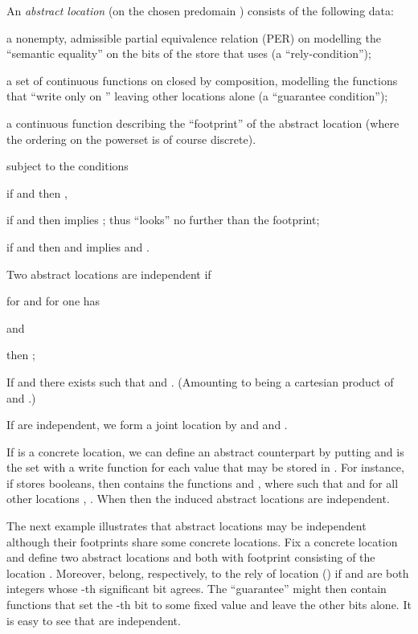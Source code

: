 \documentclass[orivec]{llncs}
\begin{document}
\begin{definition}
\label{def:abstract-location}
  An \emph{abstract location}  (on the chosen predomain
  ) consists of the following data:
\begin{compactitem}
\item a nonempty, admissible partial equivalence relation (PER)  on
   modelling the ``semantic equality'' on the bits of the
  store that  uses (a ``rely-condition'');
\item a set  of continuous functions on  closed by
composition, modelling the functions that ``write only on '' leaving 
other locations alone (a ``guarantee condition'');
\item a continuous function  describing the ``footprint''
   of the abstract location (where the ordering on the powerset
 is of course discrete).
\end{compactitem}
subject to the conditions
\begin{compactitem}
\item if  and  then ,  
\item if 
  and 
  then  implies
  ; thus  ``looks'' no further
  than the footprint;
\item if  and  then
   and
   implies  and .
\end{compactitem}
Two abstract locations  are independent if 
\begin{compactitem}
\item for  and  for  one has 

and

then ;
\item If  and 
there exists  such that  and
. (Amounting to
 being a cartesian product of  and .)
\end{compactitem}
If  are independent, we form a joint location
 by 
and
 and
. 

\end{definition}



If  is a concrete location, we can define an abstract
counterpart by putting  and  is the set with a
write function for each value that may be stored in . 
For instance, if  stores booleans, then  contains the
functions  and , where
 such that  and 
for all other locations , .
When  then the induced abstract locations are
independent.

The next example illustrates that abstract locations may be
independent although their footprints share some concrete locations.
Fix a concrete location  and define two abstract
locations  and  both with footprint consisting of the
location . Moreover,  belong, respectively, to
the rely of location  () if  and
 are both integers whose -th significant bit
agrees. The ``guarantee''  might then contain functions that
set the -th bit to some fixed value and leave the other bits
alone. It is easy to see that  are independent.
\end{document}
